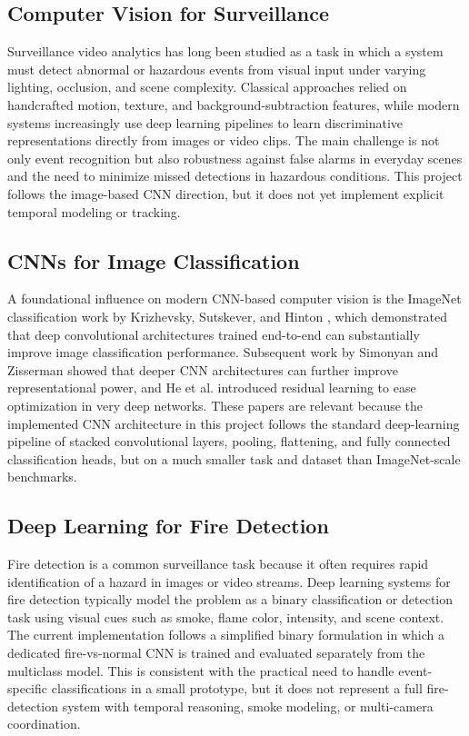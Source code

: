 \documentclass[11pt,a4paper]{article}
\begin{document}
\subsection{Computer Vision for Surveillance}
Surveillance video analytics has long been studied as a task in which a system must detect abnormal or hazardous events from visual input under varying lighting, occlusion, and scene complexity. Classical approaches relied on handcrafted motion, texture, and background-subtraction features, while modern systems increasingly use deep learning pipelines to learn discriminative representations directly from images or video clips. The main challenge is not only event recognition but also robustness against false alarms in everyday scenes and the need to minimize missed detections in hazardous conditions. This project follows the image-based CNN direction, but it does not yet implement explicit temporal modeling or tracking.

\subsection{CNNs for Image Classification}
A foundational influence on modern CNN-based computer vision is the ImageNet classification work by Krizhevsky, Sutskever, and Hinton \cite{krizhevsky2012}, which demonstrated that deep convolutional architectures trained end-to-end can substantially improve image classification performance. Subsequent work by Simonyan and Zisserman \cite{simonyan2015} showed that deeper CNN architectures can further improve representational power, and He et al. \cite{he2016} introduced residual learning to ease optimization in very deep networks. These papers are relevant because the implemented CNN architecture in this project follows the standard deep-learning pipeline of stacked convolutional layers, pooling, flattening, and fully connected classification heads, but on a much smaller task and dataset than ImageNet-scale benchmarks.

\subsection{Deep Learning for Fire Detection}
Fire detection is a common surveillance task because it often requires rapid identification of a hazard in images or video streams. Deep learning systems for fire detection typically model the problem as a binary classification or detection task using visual cues such as smoke, flame color, intensity, and scene context. The current implementation follows a simplified binary formulation in which a dedicated fire-vs-normal CNN is trained and evaluated separately from the multiclass model. This is consistent with the practical need to handle event-specific classifications in a small prototype, but it does not represent a full fire-detection system with temporal reasoning, smoke modeling, or multi-camera coordination.
\end{document}
